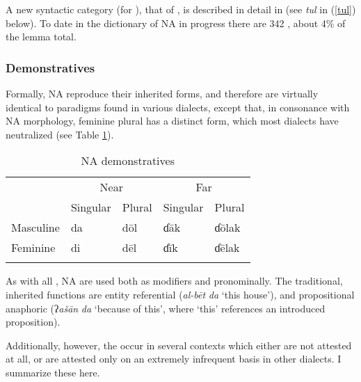 \documentclass[output=paper]{langsci/langscibook}
\begin{document}
A new syntactic category (for ), that of , is described in detail in \citet{OwensHassan2004} (see \textit{tul} in (\ref{tul}) below). To date in the dictionary of NA in progress there are 342 , about 4\% of the lemma total.

\subsubsection{Demonstratives} \label{demons}

Formally, NA  reproduce their inherited forms, and therefore are virtually identical to paradigms found in various  dialects, except that, in consonance with NA morphology, feminine plural has a distinct form, which most  dialects have neutralized (see Table \ref{demtab}).

\begin{table}

\begin{tabularx}{.655\textwidth}{lllll}
\lsptoprule
     & \multicolumn{2}{c}{Near}       & \multicolumn{2}{c}{Far} \\
& Singular &  Plural & Singular & Plural\\
\midrule
Masculine & da & dōl & ɗāk & ɗōlak\\
Feminine & di & dēl & ɗīk & ɗēlak\\
\lspbottomrule
\end{tabularx}
\caption{\label{bkm:Ref520909612}NA demonstratives}
\label{demtab}
\end{table}

As with all  , NA  are used both as modifiers and pronominally. The traditional, inherited functions are entity referential (\textit{al-bēt} \textit{da} ‘this house’), and propositional anaphoric (ʔ\textit{ašān} \textit{da} ‘because of this’, where ‘this’ references an introduced proposition).

Additionally, however, the  occur in several contexts which either are not attested at all, or are attested only on an extremely infrequent basis in other  dialects. I summarize these here.
\end{document}
